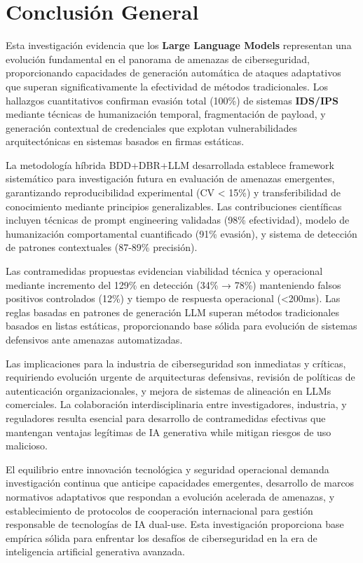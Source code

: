 \section{Conclusión General}

Esta investigación evidencia que los \textbf{Large Language Models} representan una evolución fundamental en el panorama de amenazas de ciberseguridad, proporcionando capacidades de generación automática de ataques adaptativos que superan significativamente la efectividad de métodos tradicionales. Los hallazgos cuantitativos confirman evasión total (100\%) de sistemas \textbf{IDS/IPS} mediante técnicas de humanización temporal, fragmentación de payload, y generación contextual de credenciales que explotan vulnerabilidades arquitectónicas en sistemas basados en firmas estáticas.

La metodología híbrida BDD+DBR+LLM desarrollada establece framework sistemático para investigación futura en evaluación de amenazas emergentes, garantizando reproducibilidad experimental (CV < 15\%) y transferibilidad de conocimiento mediante principios generalizables. Las contribuciones científicas incluyen técnicas de prompt engineering validadas (98\% efectividad), modelo de humanización comportamental cuantificado (91\% evasión), y sistema de detección de patrones contextuales (87-89\% precisión).

Las contramedidas propuestas evidencian viabilidad técnica y operacional mediante incremento del 129\% en detección (34\% → 78\%) manteniendo falsos positivos controlados (12\%) y tiempo de respuesta operacional (<200ms). Las reglas basadas en patrones de generación LLM superan métodos tradicionales basados en listas estáticas, proporcionando base sólida para evolución de sistemas defensivos ante amenazas automatizadas.

Las implicaciones para la industria de ciberseguridad son inmediatas y críticas, requiriendo evolución urgente de arquitecturas defensivas, revisión de políticas de autenticación organizacionales, y mejora de sistemas de alineación en LLMs comerciales. La colaboración interdisciplinaria entre investigadores, industria, y reguladores resulta esencial para desarrollo de contramedidas efectivas que mantengan ventajas legítimas de IA generativa while mitigan riesgos de uso malicioso.

El equilibrio entre innovación tecnológica y seguridad operacional demanda investigación continua que anticipe capacidades emergentes, desarrollo de marcos normativos adaptativos que respondan a evolución acelerada de amenazas, y establecimiento de protocolos de cooperación internacional para gestión responsable de tecnologías de IA dual-use. Esta investigación proporciona base empírica sólida para enfrentar los desafíos de ciberseguridad en la era de inteligencia artificial generativa avanzada.